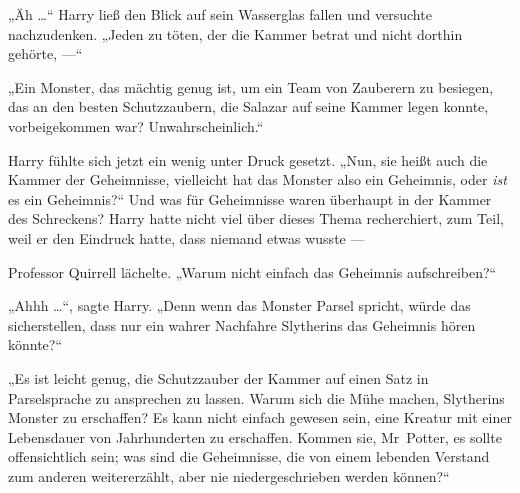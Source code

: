 „Äh …“ Harry ließ den Blick auf sein Wasserglas fallen und versuchte nachzudenken.
„Jeden zu töten, der die Kammer betrat und nicht dorthin gehörte, —“

„Ein Monster, das mächtig genug ist, um ein Team von Zauberern zu besiegen, das an den besten Schutzzaubern, die Salazar auf seine Kammer legen konnte, vorbeigekommen war? Unwahrscheinlich.“

Harry fühlte sich jetzt ein wenig unter Druck gesetzt.
„Nun, sie heißt auch die Kammer der Geheimnisse, vielleicht hat das Monster also ein Geheimnis, oder \emph{ist} es ein Geheimnis?“ Und was für Geheimnisse waren überhaupt in der Kammer des Schreckens? Harry hatte nicht viel über dieses Thema recherchiert, zum Teil, weil er den Eindruck hatte, dass niemand etwas wusste —

Professor Quirrell lächelte.
„Warum nicht einfach das Geheimnis aufschreiben?“

„Ahhh …“, sagte Harry.
„Denn wenn das Monster Parsel spricht, würde das sicherstellen, dass nur ein wahrer Nachfahre Slytherins das Geheimnis hören könnte?“

„Es ist leicht genug, die Schutzzauber der Kammer auf einen Satz in Parselsprache zu ansprechen zu lassen. Warum sich die Mühe machen, Slytherins Monster zu erschaffen? Es kann nicht einfach gewesen sein, eine Kreatur mit einer Lebensdauer von Jahrhunderten zu erschaffen. Kommen sie, Mr~Potter, es sollte offensichtlich sein; was sind die Geheimnisse, die von einem lebenden Verstand zum anderen weitererzählt, aber nie niedergeschrieben werden können?“

